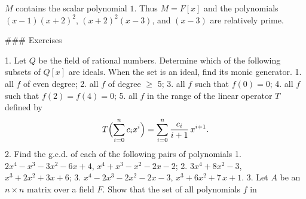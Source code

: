\(M\) contains the scalar polynomial \(1\). Thus \(M=F[x]\) and the polynomials \((x-1)(x+2)^{2}\), \((x+2)^{2}(x-3)\), and \((x-3)\) are relatively prime.

### Exercises

1. Let \(Q\) be the field of rational numbers. Determine which of the following subsets of \(Q[x]\) are ideals. When the set is an ideal, find its monic generator. 1. all \(f\) of even degree; 2. all \(f\) of degree \(\geq\) 5; 3. all \(f\) such that \(f(0)=0\); 4. all \(f\) such that \(f(2)=f(4)=0\); 5. all \(f\) in the range of the linear operator \(T\) defined by \[T\Bigl{(}\sum\limits_{i=0}^{n}c_{i}x^{i}\Bigr{)}=\sum\limits_{i=0}^{n}\frac{c_{ i}}{i+1}\,x^{i+1}.\]
2. Find the g.c.d. of each of the following pairs of polynomials 1. \(2x^{4}-x^{3}-3x^{2}-6x+4\), \(x^{4}+x^{3}-x^{2}-2x-2\); 2. \(3x^{4}+8x^{2}-3\), \(x^{3}+2x^{2}+3x+6\); 3. \(x^{4}-2x^{3}-2x^{2}-2x-3\), \(x^{3}+6x^{2}+7\,x+1\).
3. Let \(A\) be an \(n\times n\) matrix over a field \(F\). Show that the set of all polynomials \(f\) in \ 